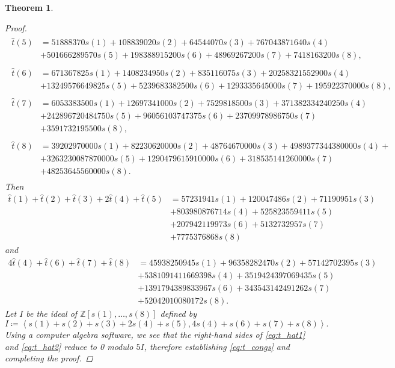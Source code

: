 \documentclass[12pt, reqno]{amsart}
\newtheorem{thm}{Theorem}[section]
\theoremstyle{definition}
\theoremstyle{remark}
\newcommand{\ZZ}{\mathbb{Z}}
\begin{document}
\begin{thm}
\begin{proof}
\begin{align*}
\begin{split}
\hat{t}(5) &= 51888370s(1) + 108839020s(2) + 64544070s(3) + 767043871640s(4) \\
&+ 501666289570s(5) + 198388915200s(6) + 48969267200s(7) + 7418163200s(8) ,
\end{split} \\
\begin{split} 
\hat{t}(6) &= 671367825s(1) + 1408234950s(2) + 835116075s(3) + 20258321552900s(4) \\
&+ 13249576649825s(5) + 5239683382500s(6) + 1293335645000s(7) + 195922370000s(8),
\end{split} \\
\begin{split}
\hat{t}(7) &=  6053383500s(1) + 12697341000s(2) + 7529818500s(3) + 371382334240250s(4) \\
&+ 242896720484750s(5) + 96056103747375s(6) + 23709978986750s(7) \\
&+ 3591732195500s(8),
\end{split} \\
\begin{split}
\hat{t}(8) &= 39202970000s(1) + 82230620000s(2) + 48764670000s(3) + 4989377344380000s(4) + \\
&+3263230087870000s(5) + 1290479615910000s(6) + 318535141260000s(7) \\
&+ 48253645560000s(8).
\end{split}
\end{align*}
Then
\begin{equation}\label{eq:t_hat1}
\begin{split}
\hat{t}(1)+\hat{t}(2) + \hat{t}(3) + 2\hat{t}(4) + \hat{t}(5) &= 57231941 s(1) + 120047486s(2) + 71190951s(3) \\
&+ 803980876714s(4) + 525823559411s(5) \\
&+ 207942119973s(6) + 5132732957s(7) \\
&+ 7775376868s(8)
\end{split}
\end{equation}
and 
\begin{equation}\label{eq:t_hat2}
\begin{split}
4\hat{t}(4) + \hat{t}(6) + \hat{t}(7) + \hat{t}(8) &= 45938250945s(1) + 96358282470s(2) + 57142702395s(3) \\
&+ 5381091411669398s(4) + 3519424397069435s(5) \\
&+ 1391794389833967s(6) + 343543142491262s(7) \\
&+ 52042010080172s(8).
\end{split}
\end{equation}
Let $I$ be the ideal of $\ZZ[s(1), \dots, s(8)]$ defined by 
\[I \coloneqq \left\langle s(1) + s(2) + s(3) + 2s(4) + s(5), 4s(4) + s(6) + s(7) + s(8)\right\rangle .\]
Using a computer algebra software, we see that the right-hand sides of \eqref{eq:t_hat1} and \eqref{eq:t_hat2} reduce to 0 modulo $5I$, therefore establishing \eqref{eq:t_congs} and completing the proof.  
\end{proof}
\end{thm}
\end{document}

